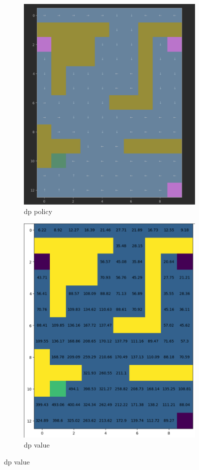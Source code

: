 \documentclass{article}
\begin{document}
    \begin{figure}[h]
        \begin{subfigure} {0.5\textwidth}
            \includegraphics[width=0.9\linewidth]{images/dp_policy}
            \caption{dp policy}\label{fig:dp_policy}
        \end{subfigure}
        \begin{subfigure} {0.5\textwidth}
            \includegraphics[width=0.9\linewidth]{images/dp_value}
            \caption{dp value}\label{fig:dp_value}
        \end{subfigure}
    \end{figure}
\end{document}
